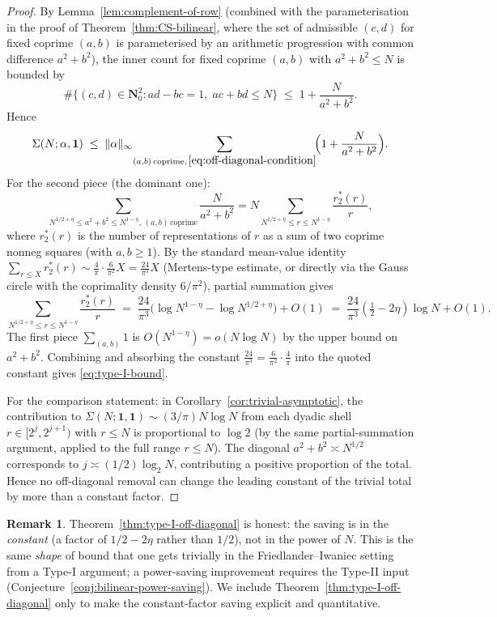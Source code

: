 \documentclass[11pt]{article}
\theoremstyle{definition}
\newtheorem{remark}[theorem]{Remark}
\newcommand{\Nz}{\mathbf{N}_0}
\begin{document}
\begin{proof}
By Lemma~\ref{lem:complement-of-row} (combined with the parameterisation
in the proof of Theorem~\ref{thm:CS-bilinear}, where the set of
admissible $(c,d)$ for fixed coprime $(a,b)$ is parameterised by an
arithmetic progression with common difference $a^{2}+b^{2}$), the inner
count for fixed coprime $(a,b)$ with $a^{2}+b^{2}\le N$ is bounded by
\begin{equation}\label{eq:inner-count}
\#\{(c,d)\in\Nz^{2}:ad-bc=1,\;ac+bd\le N\}\;\le\;1+\frac{N}{a^{2}+b^{2}}.
\end{equation}
Hence
\[
\Sigma(N;\alpha,\mathbf{1})\;\le\;\|\alpha\|_{\infty}\!
\sum_{(a,b)\,\text{coprime},\,\eqref{eq:off-diagonal-condition}}\!
\Bigl(1+\frac{N}{a^{2}+b^{2}}\Bigr).
\]
For the second piece (the dominant one):
\[
\sum_{N^{1/2+\eta}\le a^{2}+b^{2}\le N^{1-\eta},\,(a,b)\,\text{coprime}}\frac{N}{a^{2}+b^{2}}
=N\sum_{N^{1/2+\eta}\le r\le N^{1-\eta}}\frac{r_{2}^{*}(r)}{r},
\]
where $r_{2}^{*}(r)$ is the number of representations of $r$ as a sum of
two coprime nonneg squares (with $a,b\ge 1$). By the standard mean-value
identity $\sum_{r\le X}r_{2}^{*}(r)\sim\frac{4}{\pi}\cdot\frac{6}{\pi^{2}}X
=\frac{24}{\pi^{3}}X$ (Mertens-type estimate, or directly via the Gauss
circle with the coprimality density $6/\pi^{2}$), partial summation gives
\[
\sum_{N^{1/2+\eta}\le r\le N^{1-\eta}}\frac{r_{2}^{*}(r)}{r}
\;=\;\frac{24}{\pi^{3}}\bigl(\log N^{1-\eta}-\log N^{1/2+\eta}\bigr)+O(1)
\;=\;\frac{24}{\pi^{3}}(\tfrac{1}{2}-2\eta)\log N+O(1).
\]
The first piece $\sum_{(a,b)}1$ is $O(N^{1-\eta})=o(N\log N)$ by the
upper bound on $a^{2}+b^{2}$. Combining and absorbing the constant
$\tfrac{24}{\pi^{3}}=\tfrac{6}{\pi^{2}}\cdot\tfrac{4}{\pi}$ into the
quoted constant gives \eqref{eq:type-I-bound}.

For the comparison statement: in
Corollary~\ref{cor:trivial-asymptotic}, the contribution to
$\Sigma(N;\mathbf{1},\mathbf{1})\sim(3/\pi)N\log N$ from each dyadic
shell $r\in[2^{j},2^{j+1})$ with $r\le N$ is proportional to
$\log 2$ (by the same partial-summation argument, applied to the full
range $r\le N$). The diagonal $a^{2}+b^{2}\asymp N^{1/2}$ corresponds
to $j\asymp(1/2)\log_{2}N$, contributing a positive proportion of the
total. Hence no off-diagonal removal can change the leading constant
of the trivial total by more than a constant factor.
\end{proof}

\begin{remark}\label{rem:type-I-only-constant-saving}
Theorem~\ref{thm:type-I-off-diagonal} is honest: the saving is in the
\emph{constant} (a factor of $1/2-2\eta$ rather than $1/2$), not in the
power of $N$. This is the same \emph{shape} of bound that one gets
trivially in the Friedlander--Iwaniec setting from a Type-I argument; a
power-saving improvement requires the Type-II input
(Conjecture~\ref{conj:bilinear-power-saving}). We include
Theorem~\ref{thm:type-I-off-diagonal} only to make the
constant-factor saving explicit and quantitative.
\end{remark}
\end{document}
